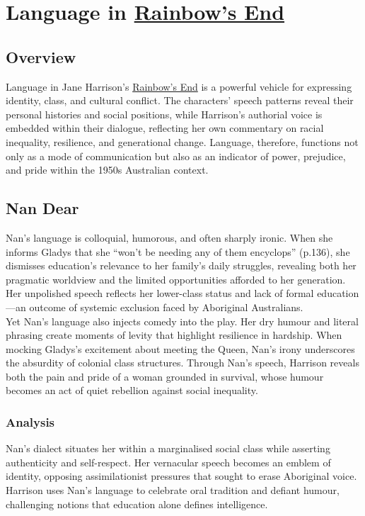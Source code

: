 \documentclass[a4paper]{article}
\begin{document}
\newpage
\section{Language in \underline{Rainbow's End}}

\subsection{Overview}
Language in Jane Harrison’s \underline{Rainbow's End} is a powerful vehicle for expressing identity, class, and cultural conflict. The characters’ speech patterns reveal their personal histories and social positions, while Harrison’s authorial voice is embedded within their dialogue, reflecting her own commentary on racial inequality, resilience, and generational change. Language, therefore, functions not only as a mode of communication but also as an indicator of power, prejudice, and pride within the 1950s Australian context.\\

\subsection{Nan Dear}
Nan’s language is colloquial, humorous, and often sharply ironic. When she informs Gladys that she “won’t be needing any of them encyclops” (p.136), she dismisses education’s relevance to her family’s daily struggles, revealing both her pragmatic worldview and the limited opportunities afforded to her generation. Her unpolished speech reflects her lower-class status and lack of formal education—an outcome of systemic exclusion faced by Aboriginal Australians.\\

Yet Nan’s language also injects comedy into the play. Her dry humour and literal phrasing create moments of levity that highlight resilience in hardship. When mocking Gladys’s excitement about meeting the Queen, Nan’s irony underscores the absurdity of colonial class structures. Through Nan’s speech, Harrison reveals both the pain and pride of a woman grounded in survival, whose humour becomes an act of quiet rebellion against social inequality.\\

\subsubsection{Analysis}
Nan’s dialect situates her within a marginalised social class while asserting authenticity and self-respect. Her vernacular speech becomes an emblem of identity, opposing assimilationist pressures that sought to erase Aboriginal voice. Harrison uses Nan’s language to celebrate oral tradition and defiant humour, challenging notions that education alone defines intelligence.\\
\end{document}
